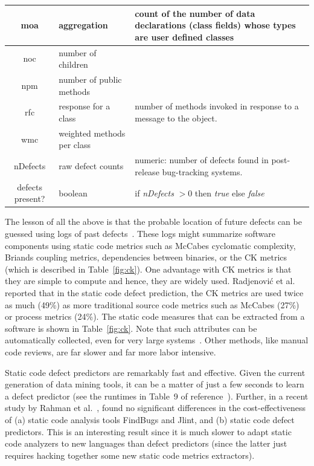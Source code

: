 \documentclass[sigconf]{acmart}
\theoremstyle{break}
\begin{document}
\begin{table}[!t]
\begin{center}
{\begin{tabular}{c|l|p{4.4in}}
\hline
moa & aggregation & count of the number of data declarations (class
fields) whose types are user defined classes\\
\hline
noc & number of children &\\
\hline
npm & number of public methods & \\
\hline
rfc & response for a class &number of methods invoked in response to
a message to the object.\\
\hline
wmc & weighted methods per class &\\
\hline
\rowcolor{lightgray}
nDefects & raw defect counts & numeric: number of defects found in post-release bug-tracking systems.\\
\rowcolor{lightgray}
defects present? & boolean& if {\em nDefects} $>0$ then {\em true} else {\em false}
\end{tabular}
}
\end{center}
\vspace{-0.3cm}
\end{table}



The lesson of all the above  is that the probable location
of future defects can be guessed using   logs of past defects~\cite{hall2012systematic, catal2009systematic}. These logs might
summarize software components using
static code metrics such as 
McCabes  cyclomatic  complexity, Briands coupling metrics, dependencies between  binaries, or
the  CK  metrics~\cite{chidamber1994metrics} (which is described in  Table~\ref{fig:ck}). 
One advantage with CK metrics is that they are  simple  to  compute and hence,
they are widely used. Radjenovi{\'c} et al.~\cite{radjenovic2013software} reported that in
the static code defect prediction, the CK metrics are
used  twice as much (49\%) 
as more traditional source code metrics such as McCabes (27\%) or process metrics (24\%).
The static code measures that can be extracted from a software is shown in   Table~\ref{fig:ck}. Note that such
attributes  can be automatically
collected, even for very large systems~\cite{nagappan2005static}. Other methods,
like manual code reviews, are far slower and far more labor intensive. 

Static code defect predictors are remarkably fast and effective.
Given the current generation of data mining tools, it can be a matter
of just a few seconds to learn a defect predictor (see the runtimes in Table~9 of reference~\cite{fu2016tuning}). Further, in a recent study by Rahman et
al.~\cite{Rahman14}, found no significant differences in the cost-effectiveness
of
(a) static code analysis tools FindBugs and Jlint, and (b) static code defect predictors.
This is an interesting result since it is  much slower to adapt static code
analyzers to new  languages than defect predictors (since the latter just requires hacking together some new
static code metrics extractors).
\end{document}
